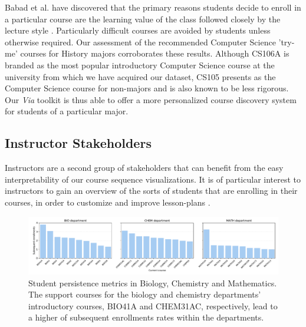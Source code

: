 \documentclass{sigchi}
\begin{document}
 Babad et al. have discovered that the primary reasons students decide to enroll in a particular course are the learning value of the class followed closely by the lecture style \cite{Babad2003}. Particularly difficult courses are avoided by students unless otherwise required. Our assessment of the recommended Computer Science 'try-me' courses for History majors corroborates these results. Although CS106A is branded as the most popular introductory Computer Science course at the university from which we have acquired our dataset, CS105 presents as the Computer Science course for non-majors and is also known to be less rigorous. Our \textit{Via} toolkit is thus able to offer a more personalized course discovery system for students of a particular major. 
 
\subsection{Instructor Stakeholders}
\label{sec:instructor_stakeholders}

Instructors are a second group of stakeholders that can benefit from the easy interpretability of our course sequence visualizations. It is of particular interest to instructors to gain an overview of the sorts of students that are enrolling in their courses, in order to customize and improve lesson-plans \cite{Leaver2002}.

\begin{figure}[h!]
    \centering
    \includegraphics[width=18cm]{final-persistence.pdf}
    \caption{Student persistence metrics in Biology, Chemistry and Mathematics. The support courses for the biology and chemistry departments' introductory courses, BIO41A and CHEM31AC, respectively, lead to a higher of subsequent enrollments rates within the departments.}
    \label{fig:persistence}
\end{figure}
\end{document}
